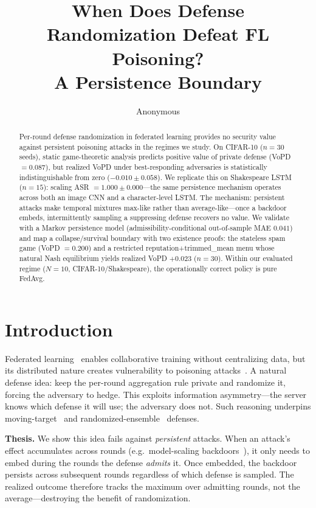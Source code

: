 \documentclass{article}
\title{When Does Defense Randomization Defeat FL Poisoning?\\ A Persistence Boundary}
\author{Anonymous}
\begin{document}
\maketitle

\begin{abstract}
Per-round defense randomization in federated learning provides no security value against persistent poisoning attacks in the regimes we study. On CIFAR-10 ($n=30$ seeds), static game-theoretic analysis predicts positive value of private defense (VoPD $= 0.087$), but realized VoPD under best-responding adversaries is statistically indistinguishable from zero ($-0.010 \pm 0.058$). We replicate this on Shakespeare LSTM ($n=15$): scaling ASR $= 1.000 \pm 0.000$---the same persistence mechanism operates across both an image CNN and a character-level LSTM. The mechanism: persistent attacks make temporal mixtures max-like rather than average-like---once a backdoor embeds, intermittently sampling a suppressing defense recovers no value. We validate with a Markov persistence model (admissibility-conditional out-of-sample MAE $0.041$) and map a collapse/survival boundary with two existence proofs: the stateless spam game (VoPD $= 0.200$) and a restricted reputation+trimmed\_mean menu whose natural Nash equilibrium yields realized VoPD $+0.023$ ($n=30$). Within our evaluated regime ($N{=}10$, CIFAR-10/Shakespeare), the operationally correct policy is pure FedAvg.
\end{abstract}

\section{Introduction}
\label{sec:intro}

Federated learning~\citep{mcmahan2017communication} enables collaborative training without centralizing data, but its distributed nature creates vulnerability to poisoning attacks~\citep{bagdasaryan2020backdoor,wang2020attack,xie2019dba}. A natural defense idea: keep the per-round aggregation rule private and randomize it, forcing the adversary to hedge. This exploits information asymmetry---the server knows which defense it will use; the adversary does not. Such reasoning underpins moving-target~\citep{liu2018towards} and randomized-ensemble~\citep{xie2018mitigating} defenses.

\textbf{Thesis.} We show this idea fails against \emph{persistent} attacks. When an attack's effect accumulates across rounds (e.g.\ model-scaling backdoors~\citep{bagdasaryan2020backdoor}), it only needs to embed during the rounds the defense \emph{admits} it. Once embedded, the backdoor persists across subsequent rounds regardless of which defense is sampled. The realized outcome therefore tracks the maximum over admitting rounds, not the average---destroying the benefit of randomization.
\end{document}
